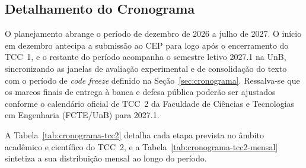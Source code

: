 \subsection{Detalhamento do Cronograma}
\label{subsec:detalhamento-cronograma-tcc2}

O planejamento abrange o período de dezembro de 2026 a julho de 2027. O início em dezembro antecipa a submissão ao CEP para logo após o encerramento do TCC~1, e o restante do período acompanha o semestre letivo 2027.1 na UnB, sincronizando as janelas de avaliação experimental e de consolidação do texto com o período de \textit{code freeze} definido na Seção~\ref{sec:cronograma}. Ressalva-se que os marcos finais de entrega à banca e defesa pública poderão ser ajustados conforme o calendário oficial de TCC~2 da Faculdade de Ciências e Tecnologias em Engenharia (FCTE/UnB) para 2027.1.

A Tabela~\ref{tab:cronograma-tcc2} detalha cada etapa prevista no âmbito acadêmico e científico do TCC~2, e a Tabela~\ref{tab:cronograma-tcc2-mensal} sintetiza a sua distribuição mensal ao longo do período.

